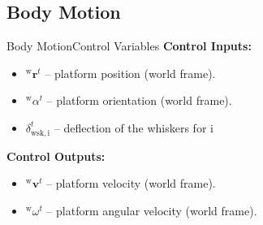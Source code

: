 \documentclass[AIRbeamer
,optEnglish
,optBiber
,optBibstyleAlphabetic
,optBeamerClassicFormat%
]{AIRlatex}
\begin{document}
    \subsection{Body Motion}
    \begin{frame}{Body Motion}{Control Variables}
        \textbf{Control Inputs:}
        \begin{itemize}
            \item \(^{\mathrm{w}}\boldsymbol{r}^{t}\) -- platform position (world frame).
            \item \(^{\mathrm{w}}\alpha^{t}\) -- platform orientation (world frame).
            \item \(\delta_{\mathrm{wsk,i}}^{t}\) -- deflection of the whiskers for i
        \end{itemize}

        \textbf{Control Outputs:}
        \begin{itemize}
            \item \(^{\mathrm{w}}\boldsymbol{v}^{t}\) -- platform velocity (world frame).
            \item \(^{\mathrm{w}}\omega^{t}\) -- platform angular velocity (world frame).
        \end{itemize}
    \end{frame}
\end{document}
